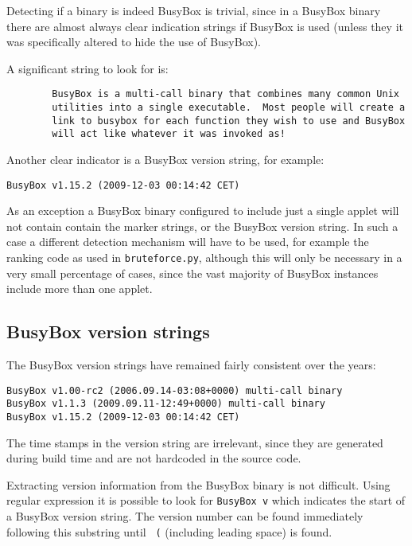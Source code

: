 \documentclass[10pt]{article}
\begin{document}
Detecting if a binary is indeed BusyBox is trivial, since in a BusyBox binary
there are almost always clear indication strings if BusyBox is used (unless
they it was specifically altered to hide the use of BusyBox).

A significant string to look for is:

\begin{verbatim}
        BusyBox is a multi-call binary that combines many common Unix
        utilities into a single executable.  Most people will create a
        link to busybox for each function they wish to use and BusyBox
        will act like whatever it was invoked as!
\end{verbatim}

Another clear indicator is a BusyBox version string, for example:

\begin{verbatim}
BusyBox v1.15.2 (2009-12-03 00:14:42 CET)
\end{verbatim}

As an exception a BusyBox binary configured to include just a single applet
will not contain contain the marker strings, or the BusyBox version string. In
such a case a different detection mechanism will have to be used, for example
the ranking code as used in \texttt{bruteforce.py}, although this will only be
necessary in a very small percentage of cases, since the vast majority of
BusyBox instances include more than one applet.

\subsection{BusyBox version strings}

The BusyBox version strings have remained fairly consistent over the years:

\begin{verbatim}
BusyBox v1.00-rc2 (2006.09.14-03:08+0000) multi-call binary
BusyBox v1.1.3 (2009.09.11-12:49+0000) multi-call binary
BusyBox v1.15.2 (2009-12-03 00:14:42 CET)
\end{verbatim}

The time stamps in the version string are irrelevant, since they are generated
during build time and are not hardcoded in the source code.

Extracting version information from the BusyBox binary is not difficult.
Using regular expression it is possible to look for \texttt{BusyBox v} which
indicates the start of a BusyBox version string. The version number can be
found immediately following this substring until \texttt{ (} (including
leading space) is found.
\end{document}
